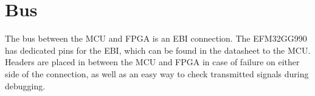 \documentclass[../main/report.tex]{subfiles}
\begin{document}
\section{Bus}
The bus between the MCU and FPGA is an EBI connection.
The EFM32GG990 has dedicated pins for the EBI, which can be found in the datasheet \cite{EFM32-datasheet} to the MCU.
Headers are placed in between the MCU and FPGA in case of failure on either side of the connection, as well as an easy way to check transmitted signals during debugging.
\end{document}
